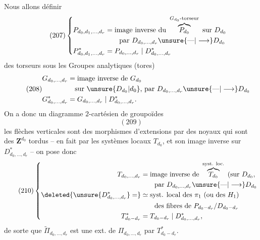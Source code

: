 Nous allons définir
\[
\tag{207}
\left\{\begin{aligned}
P_{d_0,d_1,\ldots,d_r}&=\text{image inverse du }\overbrace{P_{d_0}}^{G_{d_0}\text{-torseur}}\text{ sur }D_{d_0}\\
&\qquad\text{par }D_{d_0,\ldots,d_r}\unsure{\text{---}|\longrightarrow}D_{d_0}\\
P^*_{d_0,d_1,\ldots,d_r}&=P_{d_0,\ldots,d_r}\mid D^*_{d_0,\ldots,d_r}
\end{aligned}\right.
\]
 des torseurs sous les Groupes analytiques
(tores)
\[
\tag{208}
\begin{aligned}
G_{d_0,\ldots,d_r}&=\text{image inverse de }G_{d_0}\\
&\quad\text{sur }\unsure{D_{d_0}|d_0}\text{, par }D_{d_0,\ldots,d_r}\unsure{\text{---}|\longrightarrow}D_{d_0}\\
G^*_{d_0,\ldots,d_r}&=G_{d_0,\ldots,d_r}\mid D^*_{d_0,\ldots,d_r}.
\end{aligned}
\]
On a donc un diagramme $2$-cartésien de groupoïdes
\[
(209)
\]
les flèches verticales sont des morphismes
d'extensions par des noyaux qui sont des $\mathbf Z^{d_0}$
tordus -- en fait par les systèmes locaux
$T_{d_0}$, et son image inverse sur $D^*_{d_0,\ldots,d_r}$ --
on pose donc
\[
\tag{210}
\left\{\begin{aligned}
T_{d_0,\ldots,d_r}&=\text{image inverse de }\overbrace{T_{d_0}}^{\text{syst. loc.}}\text{ (sur }D_{d_0},\\
&\qquad\text{par }D_{d_0,\ldots,d_r}\unsure{\text{---}|\longrightarrow}D_{d_0}\\
\deleted{\unsure{D^*_{d_0,\ldots,d_r}}=}
&\simeq\text{syst. local des }\pi_1\text{ (ou des }H_1\text{)}\\
&\qquad\text{des fibres de }P_{d_0- d_r}/D_{d_0- d_r}\\
T^*_{d_0- d_r}&=T_{d_0- d_r}\mid D^*_{d_0,\ldots,d_r},
\end{aligned}\right.
\]
de sorte que $\widetilde\Pi_{d_0,\ldots,d_r}$ est une ext. de
$\Pi_{d_0,\ldots,d_r}$ par $T^*_{d_0- d_r}$.

